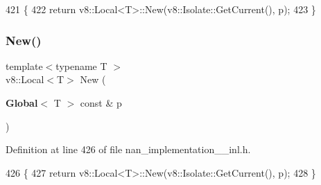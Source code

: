 \begin{DoxyCode}
421                                                  \{
422   \textcolor{keywordflow}{return} v8::Local<T>::New(v8::Isolate::GetCurrent(), p);
423 \}
\end{DoxyCode}
\mbox{\label{nan__implementation__12__inl_8h_a2c93beb386312e1982816de2fede732f}} 
\subsubsection{New()\hspace{0.1cm}{\footnotesize\ttfamily [3/3]}}
{\footnotesize\ttfamily template$<$typename T $>$ \\
v8\+::\+Local$<$T$>$ New (\begin{DoxyParamCaption}\item[{\textbf{ Global}$<$ T $>$ const \&}]{p }\end{DoxyParamCaption})}



Definition at line 426 of file nan\+\_\+implementation\+\_\+\_\+inl.\+h.


\begin{DoxyCode}
426                                           \{
427   \textcolor{keywordflow}{return} v8::Local<T>::New(v8::Isolate::GetCurrent(), p);
428 \}
\end{DoxyCode}
